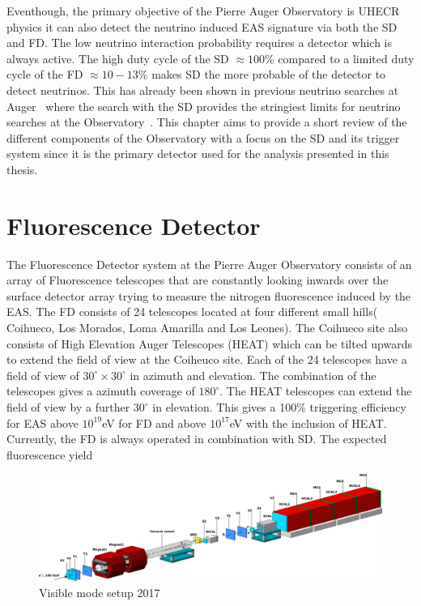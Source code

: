 Eventhough, the primary objective of the Pierre Auger Observatory is UHECR physics it can also detect the neutrino induced EAS signature via both the SD and FD. The low neutrino interaction probability requires a detector which is always active. The high duty cycle of the SD $\approx 100$\% compared to a limited duty cycle of the FD $\approx 10-13$\% makes SD the more probable of the detector to detect neutrinos. This has already been shown in previous neutrino searches at Auger~\cite{} where the search with the SD provides the stringiest limits for neutrino searches at the Observatory~\cite{}. This chapter aims to provide a short review of the different components of the Observatory with a focus on the SD and its trigger system since it is the primary detector used for the analysis presented in this thesis. 

\section*{Fluorescence Detector}
\label{sec:Fl_det}
The Fluorescence Detector system at the Pierre Auger Observatory consists of an array of Fluorescence telescopes that are constantly looking inwards over the surface detector array trying to measure the nitrogen fluorescence induced by the EAS. The FD consists of 24 telescopes located at four different small hills( Coihueco, Los Morados, Loma Amarilla and Los Leones). The Coihueco site also consists of High Elevation Auger Telescopes (HEAT) which can be tilted upwards to extend the field of view at the Coiheuco site. Each of the 24 telescopes have a field of view of $30^{\circ} \times 30^{\circ}$ in azimuth and elevation. The combination of the telescopes gives a azimuth coverage of $180^{\circ}$. The HEAT telescopes can extend the field of view by a further $30^{\circ}$ in elevation. This gives a 100\% triggering efficiency for EAS above $10^{19}$eV for FD and above $10^{17}$eV with the inclusion of HEAT. Currently, the FD is always operated in combination with SD. The expected fluorescence yield   



\begin{figure}[t!]
\centering
\includegraphics[width=\textwidth]{thesis_figures/Visible_3d_setup.png}
\caption{Visible mode setup 2017~\cite{Banerjee_2018}}
\label{fig:Visible_mode_setup}
\end{figure}

